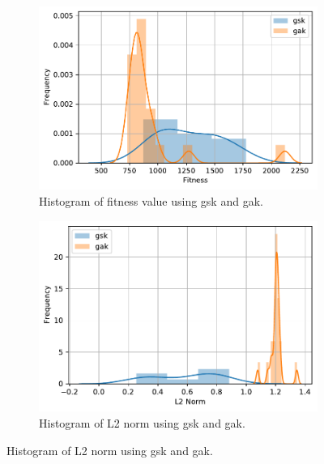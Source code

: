 \documentclass[./\jobname.tex]{subfiles}
\begin{document}
\begin{figure}[h]
	\centering
	\begin{subfigure}[b]{0.5\linewidth}
		\centering
		\includegraphics[width=1\textwidth]{../../code/experiments/experiment_3/pde5_non-adaptive_histogram_fit.pdf}
		\caption{Histogram of fitness value using \gls{gsk} and \gls{gak}.}
		\label{fig:pde5_fitness_histogram_gsk}
	\end{subfigure}%
	\begin{subfigure}[b]{0.48\linewidth}
		\centering
		\includegraphics[width=1\textwidth]{../../code/experiments/experiment_3/pde5_non-adaptive_histogram_L2.pdf}
		\caption{Histogram of L2 norm using \gls{gsk} and \gls{gak}.}
		\label{fig:pde5_L2norm_histogram_gsk}
	\end{subfigure}%
	\label{fig:pde5_ex3_histogram}
\end{figure}
\end{document}
